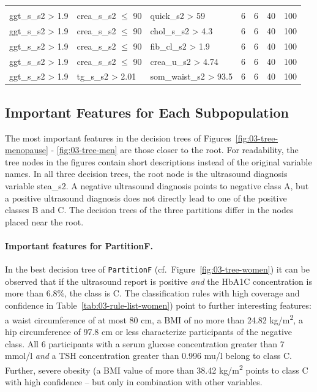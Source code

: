 \documentclass[
  oneside]{book}
\begin{document}
\begin{table}[!h]
\begin{tabular}[t]{lllrrrr}
\addlinespace[0.3em]
\multicolumn{7}{l}{\textbf{Target class: C}}\\
\hspace{1em}ggt\_s\_s2 > 1.9 & crea\_s\_s2 $\leq$ 90 & quick\_s2 > 59 & 6 & 6 & 40 & 100\\
\hspace{1em}ggt\_s\_s2 > 1.9 & crea\_s\_s2 $\leq$ 90 & chol\_s\_s2 > 4.3 & 6 & 6 & 40 & 100\\
\hspace{1em}ggt\_s\_s2 > 1.9 & crea\_s\_s2 $\leq$ 90 & fib\_cl\_s2 > 1.9 & 6 & 6 & 40 & 100\\
\hspace{1em}ggt\_s\_s2 > 1.9 & crea\_s\_s2 $\leq$ 90 & crea\_u\_s2 > 4.74 & 6 & 6 & 40 & 100\\
\hspace{1em}ggt\_s\_s2 > 1.9 & tg\_s\_s2 > 2.01 & som\_waist\_s2 > 93.5 & 6 & 6 & 40 & 100\\
\bottomrule
\end{tabular}
\end{table}

\hypertarget{imm-experiments-important-features}{%
\subsection{Important Features for Each Subpopulation}\label{imm-experiments-important-features}}

The most important features in the decision trees of Figures~\ref{fig:03-tree-menopause} - \ref{fig:03-tree-men} are those closer to the root.
For readability, the tree nodes in the figures contain short descriptions instead of the original variable names.
In all three decision trees, the root node is the ultrasound diagnosis variable stea\_s2.
A negative ultrasound diagnosis points to negative class A, but a positive ultrasound diagnosis does not directly lead to one of the positive classes B and C.
The decision trees of the three partitions differ in the nodes placed near the root.

\paragraph*{Important features for PartitionF.}

In the best decision tree of \texttt{PartitionF} (cf.~Figure~\ref{fig:03-tree-women}) it can be observed that if the ultrasound report is positive \emph{and} the HbA1C concentration is more than 6.8\%, the class is C.
The classification rules with high coverage and confidence in Table~\ref{tab:03-rule-list-women}) point to further interesting features:
a waist circumference of at most 80 cm, a BMI of no more than 24.82 kg/m\textsuperscript{2}, a hip circumference of 97.8 cm or less characterize participants of the negative class.
All 6 participants with a serum glucose concentration greater than 7 mmol/l \emph{and} a TSH concentration greater than 0.996 mu/l belong to class C.
Further, severe obesity (a BMI value of more than 38.42 kg/m\textsuperscript{2} points to class C with high confidence -- but only in combination with other variables.
\end{document}
